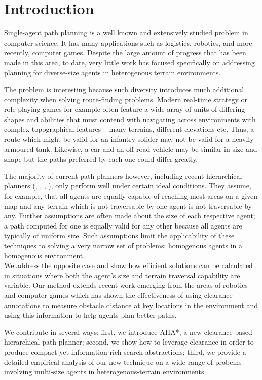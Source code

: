 \section{Introduction}
Single-agent path planning is a well known and extensively studied problem in computer science.
It has many applications such as logistics, robotics, and more recently, computer games. 
Despite the large amount of progress that has been made in this area, to date, very little work has focused specifically on addressing planning for diverse-size agents in heterogenous terrain environments. 
\par \indent
The problem is interesting because such diversity introduces much additional complexity when solving route-finding problems.
Modern real-time strategy or role-playing games for example often feature a wide array of units of differing shapes and abilities that must contend with navigating across environments with complex topographical features -- many terrains, different elevations etc. 
Thus, a route which might be valid for an infantry-solider may not be valid for a heavily armoured tank. 
Likewise, a car and an off-road vehicle may be similar in size and shape but the paths preferred by each one could differ greatly. 
\par \indent
The majority of current path planners however, including recent hierarchical planners (\cite{botea04}, \cite{sturtevant05}, \cite{demyen07}, \cite{geraerts07}), only perform well under certain ideal conditions. 
They assume, for example, that all agents are equally capable of reaching most areas on a given map and any terrain which is not traversable by one agent is not traversable by any. 
Further assumptions are often made about the size of each respective agent; a path computed for one is equally valid for any other because all agents are typically of uniform size. 
Such assumptions limit the applicability of these techniques to solving a very narrow set of problems: homogenous agents in a homogenous environment. \\
We address the opposite case and show how efficient solutions can be calculated in situations where both the agent's size and terrain traversal capability are variable. Our method extends recent work emerging from the areas of robotics and computer games which has shown the effectiveness of using clearance annotations to measure obstacle distance at key locations in the environment and using this information to help agents plan better paths. 
\par \indent
We contribute in several ways: first, we introduce AHA*, a new clearance-based hierarchical path planner; second, we show how to leverage clearance in order to produce compact yet information rich search abstractions; third, we provide a detailed empirical analysis of our new technique on a wide range of probems involving multi-size agents in heterogenous-terrain environments.
